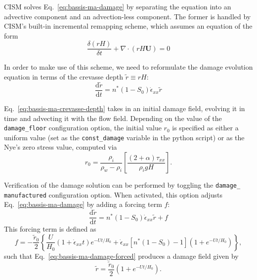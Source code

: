 \documentclass{article}
\begin{document}
CISM solves Eq.~\ref{eq:bassis-ma-damage} by separating the equation into an advective component and an advection-less component. The former is handled by CISM's built-in incremental remapping scheme, which assumes an equation of the form
\begin{equation}
   \frac{\delta \left( rH \right)}{\delta t} + \nabla\cdot\left( rH\mathbf{U} \right) = 0
   \label{eq:advection}
\end{equation}

In order to make use of this scheme, we need to reformulate the damage evolution equation in terms of the crevasse depth $\tilde{r} \equiv rH$:
\begin{equation}
   \frac{\mathrm{d}\tilde{r}}{\mathrm{d}t} = n^* \left(1-S_0\right) \dot{\epsilon}_{xx} \tilde{r}
   \label{eq:bassis-ma-crevasse-depth}
\end{equation}

Eq.~\ref{eq:bassis-ma-crevasse-depth} takes in an initial damage field, evolving it in time and advecting it with the flow field. Depending on the value of the \texttt{damage\_floor} configuration option, the initial value $r_0$ is specified as either a uniform value (set as the \texttt{const\_damage} variable in the python script) or as the Nye's zero stress value, computed via \citep{Jezek,Nick-et-al,Nye}
\begin{equation}
   r_0 = \frac{\rho_i}{\rho_w-\rho_i} \left[\frac{\left(2+\alpha\right) \tau_{xx}}{\rho_i gH}\right].
   \label{eq:nye-damage}
\end{equation}

Verification of the damage solution can be performed by toggling the \texttt{damage\_} \texttt{manufactured} configuration option. When activated, this option adjusts Eq.~\ref{eq:bassis-ma-damage} by adding a forcing term $f$:
\begin{equation}
   \frac{\mathrm{d}\tilde{r}}{\mathrm{d}t} = n^* \left(1-S_0\right) \dot{\epsilon}_{xx} \tilde{r} + f
   \label{eq:bassis-ma-damage-forced}
\end{equation}
This forcing term is defined as
\begin{equation}
   f = -\frac{\tilde{r}_0}{2} \left\{\frac{U}{H_0} \left(1+\dot{\epsilon}_{xx}t\right) e^{-Ut/H_0} + \dot{\epsilon}_{xx} \left[ n^*\left(1-S_0\right)-1 \right] \left(1+e^{-Ut/H_0}\right)\right\},
   \label{eq:damage-forcing}
\end{equation}
such that Eq.~\ref{eq:bassis-ma-damage-forced} produces a damage field given by
\begin{equation}
   \tilde{r} = \frac{\tilde{r}_0}{2} \left(1+e^{-Ut/H_0}\right).
   \label{eq:manufactured-damage}
\end{equation}



\end{document}
